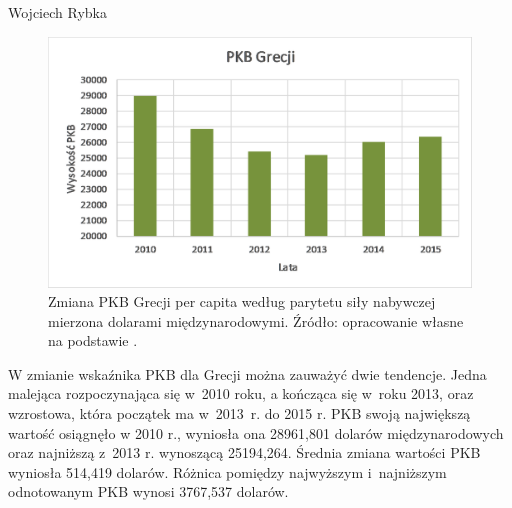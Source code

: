 \begin{artplenv}{Wojciech Rybka}
\begin{figure}[h]
	\centering
	\includegraphics[width=1\textwidth]{ART_Rybka/pkb_grecji.png} 
	\caption{Zmiana PKB Grecji per capita według parytetu siły nabywczej mierzona dolarami międzynarodowymi.
		Źródło: opracowanie własne na podstawie
		\parencite{international_monetary_fund_world_2019a}.
	}
	\label{fig4:ryb}
\end{figure}

%
%

W zmianie wskaźnika PKB dla Grecji można zauważyć dwie tendencje. Jedna malejąca rozpoczynająca się w~2010 roku,
a kończąca się w~roku 2013, oraz wzrostowa, która początek ma w~2013~r. do 2015 r. PKB swoją największą wartość osiągnęło
w 2010 r., wyniosła ona 28961,801 dolarów międzynarodowych oraz najniższą z~2013 r. wynoszącą 25194,264. Średnia zmiana
wartości PKB wyniosła 514,419 dolarów. Różnica pomiędzy najwyższym i~najniższym odnotowanym PKB wynosi 3767,537 dolarów.



\end{artplenv}
